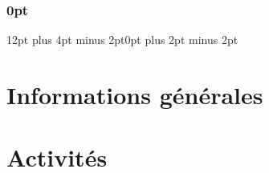 \usepackage[nohead, textwidth=16.5cm, textheight=23.5cm, ignorehead, paper=a4paper]{geometry}
\usepackage{fontspec}
\usepackage{graphicx}
\usepackage[french]{babel}
\usepackage{hyperref}
\usepackage{tikz}
\usepackage{enumitem}
\usepackage{url}
\usepackage{tabulary}
\usepackage{tcolorbox}
\usepackage{titlesec}
\usepackage{titletoc}
\usepackage{etoolbox}
\usepackage{pifont}
\usepackage{intcalc}
\usepackage{csquotes}
\usepackage[absolute]{textpos}
\usepackage[printwatermark]{xwatermark}


\setmainfont{EB Garamond}
\newfontfamily{}
\newfontfamily{}
\newfontfamily{}
\renewcommand\thepart{\Alph{part}}


\renewcommand{\leftmark}{}
\renewcommand{\rightmark}{}

\titlespacing\section{0pt}{12pt plus 4pt minus 2pt}{0pt plus 2pt minus 2pt}


\newlength{\currentparskip}
\raggedbottom

\newsavebox\mybox
\savebox{}
\newwatermark*[
  allpages,
  angle=45,
  scale=8,
  xpos=-20,
  ypos=15
]{\usebox\mybox}



\frontmatter

\clearpage

\cleardoublepage
\tableofcontents
\cleardoublepage

\mainmatter
\part{Informations générales}

\part{Activités}

